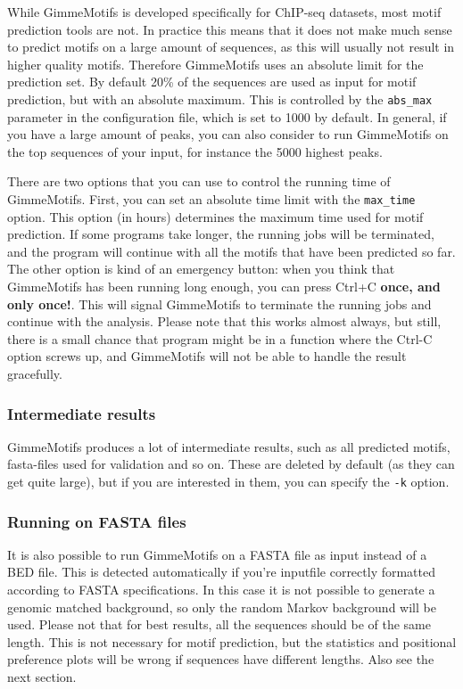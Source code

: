 \documentclass[11pt]{article}
\begin{document}
While GimmeMotifs is developed specifically for ChIP-seq datasets, most motif prediction tools are not. In practice this means that it does not make much sense to predict motifs on a large amount of sequences, as this will usually not result in higher quality motifs. Therefore GimmeMotifs uses an absolute limit for the prediction set. By default 20\% of the sequences are used as input for motif prediction, but with an absolute maximum. This is controlled by the \texttt{abs\_max} parameter in the configuration file, which is set to 1000 by default. In general, if you have a large amount of peaks, you can also consider to run GimmeMotifs on the top sequences of your input, for instance the 5000 highest peaks. 

There are two options that you can use to control the running time of GimmeMotifs. First, you can set an absolute time limit with the \texttt{max\_time} option. This option (in hours) determines the maximum time used for motif prediction. If some programs take longer, the running jobs will be terminated, and the program will continue with all the motifs that have been predicted so far. The other option is kind of an emergency button: when you think that GimmeMotifs has been running long enough, you can press Ctrl+C \textbf{once, and only once!}. This will signal GimmeMotifs to terminate the running jobs and continue with the analysis. Please note that this works almost always, but still, there is a small chance that program might be in a function where the Ctrl-C option screws up, and GimmeMotifs will not be able to handle the result gracefully. 

\subsubsection{Intermediate results}
GimmeMotifs produces a lot of intermediate results, such as all predicted motifs, fasta-files used for validation and so on. These are deleted by default (as they can get quite large), but if you are interested in them, you can specify the \texttt{-k} option.

\subsubsection{Running on FASTA files}
It is also possible to run GimmeMotifs on a FASTA file as input instead of a BED file. This is detected automatically if you're inputfile correctly formatted according to FASTA specifications. In this case it is not possible to generate a genomic matched background, so only the random Markov background will be used. Please not that for best results, all the sequences should be of the same length. This is not necessary for motif prediction, but the statistics and positional preference plots will be wrong if sequences have different lengths. Also see the next section.
\end{document}
